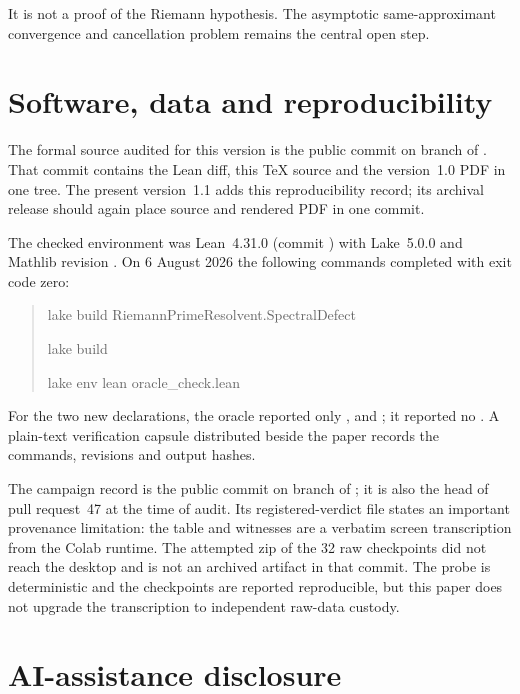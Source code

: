 \documentclass[11pt]{article}
\theoremstyle{definition}
\begin{document}
It is not a proof of the Riemann hypothesis.  The asymptotic same-approximant
convergence and cancellation problem remains the central open step.

\section*{Software, data and reproducibility}

The formal source audited for this version is the public commit
 on branch
 of
\href{https://github.com/lluiseriksson/riemann-prime-resolvent}
{}.  That commit
contains the Lean diff, this \TeX{} source and the version~1.0 PDF in one
tree.  The present version~1.1 adds this reproducibility record; its archival
release should again place source and rendered PDF in one commit.

The checked environment was Lean~4.31.0 (commit ) with
Lake~5.0.0 and Mathlib revision .  On 6 August 2026 the
following commands completed with exit code zero:
\begin{quote}\small\ttfamily
lake build RiemannPrimeResolvent.SpectralDefect\quad[8558/8558]\par
lake build\quad[8567/8567]\par
lake env lean oracle\_check.lean
\end{quote}
For the two new declarations, the oracle reported only
,  and ; it reported no
.  A plain-text verification capsule distributed beside the
paper records the commands, revisions and output hashes.

The campaign record is the public commit  on branch
 of
\href{https://github.com/lluiseriksson/riemann-resolvent-programme}
{}; it is also
the head of pull request~47 at the time of audit.  Its registered-verdict file
states an important provenance limitation: the table and witnesses are a
verbatim screen transcription from the Colab runtime.  The attempted zip of
the 32 raw checkpoints did not reach the desktop and is not an archived
artifact in that commit.  The probe is deterministic and the checkpoints are
reported reproducible, but this paper does not upgrade the transcription to
independent raw-data custody.

\section*{AI-assistance disclosure}
\end{document}
